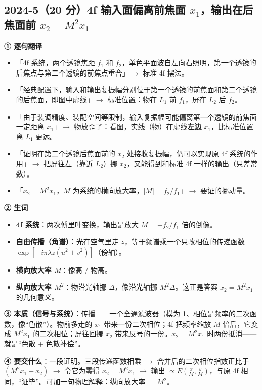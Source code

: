 \subsection{2024-5（20 分）4f 输入面偏离前焦面 $x_1$，输出在后焦面前 $x_2=M^2x_1$}\label{ex:2024-5}
\label{rd:2024-5}
\begin{idea}[读题：这道题在说什么]
\textbf{① 逐句翻译}
\begin{itemize}
\item 「4f 系统，两个透镜焦距 $f_1$ 和 $f_2$，单色平面波自左向右照明，第一个透镜的后焦点与第二个透镜的前焦点重合」$\to$ 标准 4f 摆法。
\item 「经典配置下，输入和输出复振幅分别位于第一个透镜的前焦面和第二个透镜的后焦面，即图中虚线」$\to$ 标准位置：物在 $L_1$ 前 $f_1$，屏在 $L_2$ 后 $f_2$。
\item 「由于装调精度、装配空间等限制，输入复振幅可能偏离第一个透镜的前焦面一定距离 $x_1$」$\to$ 物放歪了：看图，实线（物）在虚线\textbf{左边} $x_1$，比标准位置离 $L_1$ 更远。
\item 「证明在第二个透镜后焦面前的 $x_2$ 处接收复振幅，仍可以实现原 4f 系统的作用」$\to$ 把屏往左（靠近 $L_2$）挪 $x_2$，又能得到和标准 4f 一样的输出（只差常数）。
\item 「$x_2=M^2x_1$，$M$ 为系统的横向放大率，$|M|=f_2/f_1$」$\to$ 要证的挪动量。
\end{itemize}
\textbf{② 生词}
\begin{itemize}
\item \textbf{4f 系统}：两次傅里叶变换，输出是放大 $M=-f_2/f_1$ 倍的倒像。
\item \textbf{自由传播（角谱）}：光在空气里走 $z$，等于频谱乘一个只改相位的传递函数 $\exp[-i\pi\lambda z(u^2+v^2)]$（傍轴）。
\item \textbf{横向放大率 $M$}：像高 / 物高。
\item \textbf{纵向放大率 $M^2$}：物沿光轴挪 $\Delta$，像沿光轴挪 $M^2\Delta$。这正是答案 $x_2=M^2x_1$ 的几何意义。
\end{itemize}
\textbf{③ 本质（信号与系统）}：传播 $=$ 一个全通滤波器（模为 1、相位是频率的二次函数，像“色散”）。物前多走的 $x_1$ 带来一份二次相位；4f 把频率缩放 $M$ 倍后，它变成 $M^2x_1$ 的二次相位；屏往回挪 $x_2$ 带来反号的一份。$x_2=M^2x_1$ 时两份抵消——就是“色散 + 色散补偿”。

\textbf{④ 要交什么}：一段证明。三段传递函数相乘 $\to$ 合并后的二次相位指数正比于 $(M^2x_1-x_2)$ $\to$ 令它为零得 $x_2=M^2x_1$ $\to$ 输出 $\propto E(\frac xM,\frac yM)$，与原 4f 相同，“证毕”。可加一句物理解释：纵向放大率 $=M^2$。
\end{idea}

